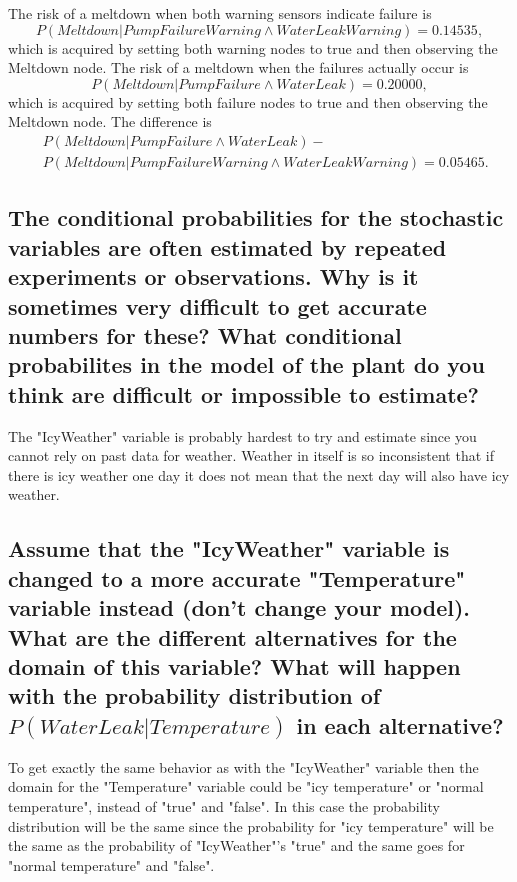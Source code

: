 \documentclass[a4paper,10pt]{article}
\begin{document}
The risk of a meltdown when both warning sensors indicate failure is 
\begin{equation*}
	P(Meltdown | PumpFailureWarning \wedge WaterLeakWarning) = 0.14535,
\end{equation*}
which is acquired by setting both warning nodes to true and then observing the Meltdown node.
The risk of a meltdown when the failures actually occur is 
\begin{equation*}
	P(Meltdown | PumpFailure \wedge WaterLeak) = 0.20000,
\end{equation*}
which is acquired by setting both failure nodes to true and then observing the Meltdown node.
The difference is 
\begin{align*}
	&P(Meltdown | PumpFailure \wedge WaterLeak) - 
	\\
	&P(Meltdown|PumpFailureWarning \wedge WaterLeakWarning) = 0.05465.
\end{align*}

\subsection{The conditional probabilities for the stochastic variables are often estimated by repeated experiments or observations. 
Why is it sometimes very difficult to get accurate numbers for these? 
What conditional probabilites in the model of the plant do you think are difficult or impossible to estimate?}

The "IcyWeather" variable is probably hardest to try and estimate since you cannot rely on past data for weather.
Weather in itself is so inconsistent that if there is icy weather one day it does not mean that the next day will also have icy weather.

\subsection{Assume that the "IcyWeather" variable is changed to a more accurate "Temperature" variable instead (don't change your model). 
What are the different alternatives for the domain of this variable? 
What will happen with the probability distribution of $P(WaterLeak | Temperature)$ in each alternative?}

To get exactly the same behavior as with the "IcyWeather" variable then the domain for the "Temperature" variable could be "icy temperature" or "normal temperature",
instead of "true" and "false".
In this case the probability distribution will be the same since the probability for "icy temperature" will be the same as the probability of "IcyWeather"'s "true" and
the same goes for "normal temperature" and "false".
\end{document}
